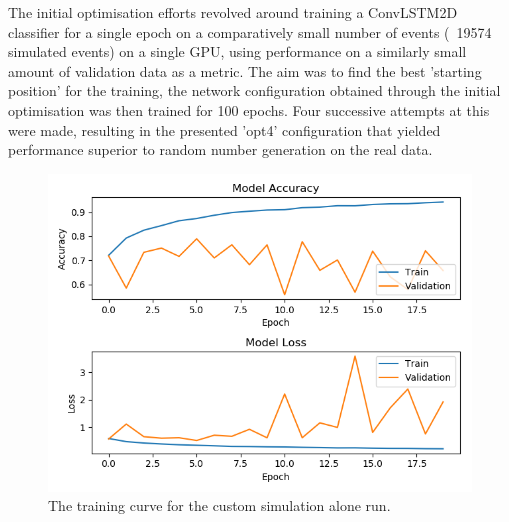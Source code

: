 The initial optimisation efforts revolved around training a ConvLSTM2D classifier for a single epoch on a comparatively small number of events (~19574 simulated events) on a single GPU, using performance on a similarly small amount of validation data as a metric. The aim was to find the best 'starting position' for the training, the network configuration obtained through the initial optimisation was then trained for 100 epochs. Four successive attempts at this were made, resulting in the presented 'opt4' configuration that yielded performance superior to random number generation on the real data. 


\begin{table}[h]
    \centering
    \caption{Anasum output for custom simulations alone run.}
    \label{table:RNG}
\end{table}

\begin{figure}[] 
        \centering \includegraphics[width=\columnwidth]{figures/crabrun2trainlog.png}

        \caption{
                \label{fig:cr2_trainlog} The training curve for the custom simulation alone run.
        }
\end{figure}

